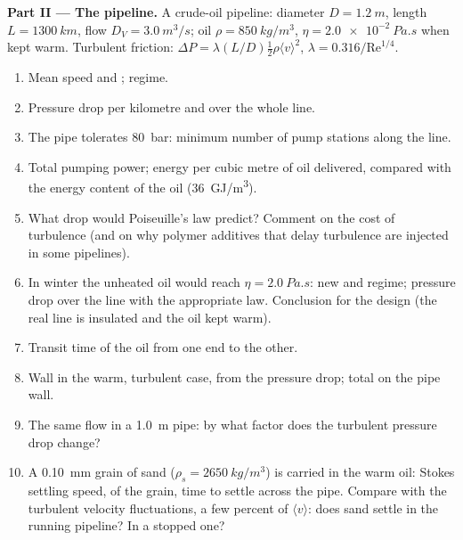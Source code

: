 \begin{problem}
\medskip
\noindent\textbf{Part II --- The pipeline.}
A crude-oil pipeline: diameter $D = \qty{1.2}{m}$, length $L = \qty{1300}{km}$,
flow $D_V = \qty{3.0}{m^3/s}$; oil $\rho = \qty{850}{kg/m^3}$, $\eta =
\qty{2.0e-2}{Pa.s}$ when kept warm. Turbulent friction: $\Delta P = \lambda
(L/D)\tfrac12\rho\langle v\rangle^2$, $\lambda = 0.316/\mathrm{Re}^{1/4}$.
\begin{enumerate}[resume]
  \item Mean speed and ; regime.
  \item Pressure drop per kilometre and over the whole line.
  \item The pipe tolerates \qty{80}{bar}: minimum number of pump stations
        along the line.
  \item Total pumping power; energy per cubic metre of oil delivered,
        compared with the energy content of the oil (\qty{36}{GJ/m^3}).
  \item What drop would Poiseuille's law predict? Comment on the cost
        of turbulence (and on why polymer additives that delay
        turbulence are injected in some pipelines).
  \item In winter the unheated oil would reach $\eta = \qty{2.0}{Pa.s}$:
        new  and regime; pressure drop over the line
        with the appropriate law. Conclusion for the design (the real
        line is insulated and the oil kept warm).
  \item Transit time of the oil from one end to the other.
  \item Wall  in the warm, turbulent case, from the
        pressure drop; total  on the pipe wall.
  \item The same flow in a \qty{1.0}{m} pipe: by what factor does the
        turbulent pressure drop change?
  \item A \qty{0.10}{mm} grain of sand ($\rho_s = \qty{2650}{kg/m^3}$) is carried
        in the warm oil: Stokes settling speed,  of the
        grain, time to settle across the pipe. Compare with the
        turbulent velocity fluctuations, a few percent of $\langle v
        \rangle$: does sand settle in the running pipeline? In a
        stopped one?
\end{enumerate}


\end{problem}
